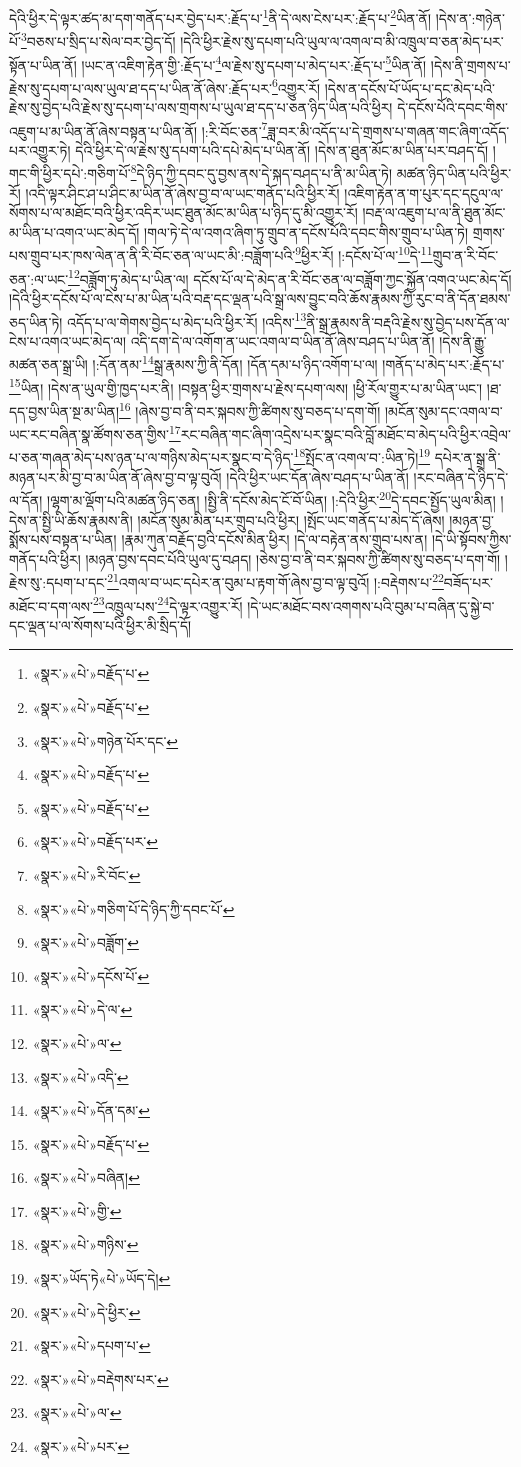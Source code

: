 དེའི་ཕྱིར་དེ་ལྟར་ཚད་མ་དག་གནོད་པར་བྱེད་པར་:རྗོད་པ་\footnote{«སྣར་»«པེ་»བརྗོད་པ་}ནི་དེ་ལས་ངེས་པར་:རྗོད་པ་\footnote{«སྣར་»«པེ་»བརྗོད་པ་}ཡིན་ནོ། །དེས་ན་:གཉེན་པོ་\footnote{«སྣར་»«པེ་»གཉེན་པོར་དང་}བཅས་པ་སྲིད་པ་སེལ་བར་བྱེད་དོ། །དེའི་ཕྱིར་རྗེས་སུ་དཔག་པའི་ཡུལ་ལ་འགལ་བ་མི་འཁྲུལ་བ་ཅན་མེད་པར་སྟོན་པ་ཡིན་ནོ། །ཡང་ན་འཇིག་རྟེན་གྱི་:རྗོད་པ་\footnote{«སྣར་»«པེ་»བརྗོད་པ་}ལ་རྗེས་སུ་དཔག་པ་མེད་པར་:རྗོད་པ་\footnote{«སྣར་»«པེ་»བརྗོད་པ་}ཡིན་ནོ། །དེས་ནི་གྲགས་པ་རྗེས་སུ་དཔག་པ་ལས་ཡུལ་ཐ་དད་པ་ཡིན་ནོ་ཞེས་:རྗོད་པར་\footnote{«སྣར་»«པེ་»བརྗོད་པར་}འགྱུར་རོ། །དེས་ན་དངོས་པོ་ཡོད་པ་དང་མེད་པའི་རྗེས་སུ་བྱེད་པའི་རྗེས་སུ་དཔག་པ་ལས་གྲགས་པ་ཡུལ་ཐ་དད་པ་ཅན་ཉིད་ཡིན་པའི་ཕྱིར། དེ་དངོས་པོའི་དབང་གིས་འཇུག་པ་མ་ཡིན་ནོ་ཞེས་བསྟན་པ་ཡིན་ནོ། །:རི་བོང་ཅན་\footnote{«སྣར་»«པེ་»རི་བོང་}ཟླ་བར་མི་འདོད་པ་དེ་གྲགས་པ་གཞན་གང་ཞིག་འདོད་པར་འགྱུར་ཏེ། དེའི་ཕྱིར་དེ་ལ་རྗེས་སུ་དཔག་པའི་དཔེ་མེད་པ་ཡིན་ནོ། །དེས་ན་ཐུན་མོང་མ་ཡིན་པར་བཤད་དོ། །གང་གི་ཕྱིར་དཔེ་:གཅིག་པོ་\footnote{«སྣར་»«པེ་»གཅིག་པོ་དེ་ཉིད་ཀྱི་དབང་པོ་}དེ་ཉིད་ཀྱི་དབང་དུ་བྱས་ནས་དེ་སྐད་བཤད་པ་ནི་མ་ཡིན་ཏེ། མཚན་ཉིད་ཡིན་པའི་ཕྱིར་རོ། །འདི་ལྟར་ཤིང་ཤ་པ་ཤིང་མ་ཡིན་ནོ་ཞེས་བྱ་བ་ལ་ཡང་གནོད་པའི་ཕྱིར་རོ། །འཇིག་རྟེན་ན་ག་པུར་དང་དངུལ་ལ་སོགས་པ་ལ་མཐོང་བའི་ཕྱིར་འདིར་ཡང་ཐུན་མོང་མ་ཡིན་པ་ཉིད་དུ་མི་འགྱུར་རོ། །བརྡ་ལ་འཇུག་པ་ལ་ནི་ཐུན་མོང་མ་ཡིན་པ་འགའ་ཡང་མེད་དོ། །གལ་ཏེ་དེ་ལ་འགའ་ཞིག་ཏུ་གྲུབ་ན་དངོས་པོའི་དབང་གིས་གྲུབ་པ་ཡིན་ཏེ། གྲགས་པས་གྲུབ་པར་ཁས་ལེན་ན་ནི་རི་བོང་ཅན་ལ་ཡང་མི་:བཟློག་པའི་\footnote{«སྣར་»«པེ་»བཟློག་}ཕྱིར་རོ། །:དངོས་པོ་ལ་\footnote{«སྣར་»«པེ་»དངོས་པོ་}དེ་\footnote{«སྣར་»«པེ་»དེ་ལ་}གྲུབ་ན་རི་བོང་ཅན་:ལ་ཡང་\footnote{«སྣར་»«པེ་»ལ་}བཟློག་ཏུ་མེད་པ་ཡིན་ལ། དངོས་པོ་ལ་དེ་མེད་ན་རི་བོང་ཅན་ལ་བཟློག་ཀྱང་སྐྱོན་འགའ་ཡང་མེད་དོ། །དེའི་ཕྱིར་དངོས་པོ་ལ་ངེས་པ་མ་ཡིན་པའི་བརྡ་དང་ལྡན་པའི་སྒྲ་ལས་བྱུང་བའི་ཆོས་རྣམས་ཀྱི་རུང་བ་ནི་དོན་ཐམས་ཅད་ཡིན་ཏེ། འདོད་པ་ལ་གེགས་བྱེད་པ་མེད་པའི་ཕྱིར་རོ། །འདིས་\footnote{«སྣར་»«པེ་»འདི་}ནི་སྒྲ་རྣམས་ནི་བརྡའི་རྗེས་སུ་བྱེད་པས་དོན་ལ་ངེས་པ་འགའ་ཡང་མེད་ལ། འདི་དག་དེ་ལ་འགོག་ན་ཡང་འགལ་བ་ཡིན་ནོ་ཞེས་བཤད་པ་ཡིན་ནོ། །དེས་ནི་རྒྱུ་མཚན་ཅན་སྒྲ་ཡི། །:དོན་ནམ་\footnote{«སྣར་»«པེ་»དོན་དམ་}སྒྲ་རྣམས་ཀྱི་ནི་དོན། །དོན་དམ་པ་ཉིད་འགོག་པ་ལ། །གནོད་པ་མེད་པར་:རྗོད་པ་\footnote{«སྣར་»«པེ་»བརྗོད་པ་}ཡིན། །དེས་ན་ཡུལ་གྱི་ཁྱད་པར་ནི། །བསྟན་ཕྱིར་གྲགས་པ་རྗེས་དཔག་ལས། །ཕྱི་རོལ་གྱུར་པ་མ་ཡིན་ཡང་། །ཐ་དད་བྱས་ཡིན་སྔ་མ་ཡིན།\footnote{«སྣར་»«པེ་»བཞིན།} །ཞེས་བྱ་བ་ནི་བར་སྐབས་ཀྱི་ཚིགས་སུ་བཅད་པ་དག་གོ། །མངོན་སུམ་དང་འགལ་བ་ཡང་རང་བཞིན་སྣ་ཚོགས་ཅན་གྱིས་\footnote{«སྣར་»«པེ་»གྱི་}རང་བཞིན་གང་ཞིག་འདྲེས་པར་སྣང་བའི་བློ་མཐོང་བ་མེད་པའི་ཕྱིར་འབྲེལ་པ་ཅན་གཞན་མེད་པས་ཉན་པ་ལ་གཉིས་མེད་པར་སྣང་བ་དེ་ཉིད་\footnote{«སྣར་»«པེ་»གཉིས་}སྤོང་ན་འགལ་བ་:ཡིན་ཏེ།\footnote{«སྣར་»ཡོད་ཏེ«པེ་»ཡོད་དེ།} དཔེར་ན་སྒྲ་ནི་མཉན་པར་མི་བྱ་བ་མ་ཡིན་ནོ་ཞེས་བྱ་བ་ལྟ་བུའོ། །དེའི་ཕྱིར་ཡང་དོན་ཞེས་བཤད་པ་ཡིན་ནོ། །རང་བཞིན་དེ་ཉིད་དེ་ལ་དོན། །ལྷག་མ་ལྡོག་པའི་མཚན་ཉིད་ཅན། །སྤྱི་ནི་དངོས་མེད་ངོ་བོ་ཡིན། །:དེའི་ཕྱིར་\footnote{«སྣར་»«པེ་»དེ་ཕྱིར་}དེ་དབང་སྤྱོད་ཡུལ་མིན། །དེས་ན་སྤྱི་ཡི་ཆོས་རྣམས་ནི། །མངོན་སུམ་མིན་པར་གྲུབ་པའི་ཕྱིར། །སྤོང་ཡང་གནོད་པ་མེད་དོ་ཞེས། །མཉན་བྱ་སྨོས་པས་བསྟན་པ་ཡིན། །རྣམ་ཀུན་བརྗོད་བྱའི་དངོས་མིན་ཕྱིར། །དེ་ལ་བརྟེན་ནས་གྲུབ་པས་ན། །དེ་ཡི་སྟོབས་ཀྱིས་གནོད་པའི་ཕྱིར། །མཉན་བྱས་དབང་པོའི་ཡུལ་དུ་བཤད། །ཅེས་བྱ་བ་ནི་བར་སྐབས་ཀྱི་ཚིགས་སུ་བཅད་པ་དག་གོ། །རྗེས་སུ་:དཔག་པ་དང་\footnote{«སྣར་»«པེ་»དཔག་པ་}འགལ་བ་ཡང་དཔེར་ན་བུམ་པ་རྟག་གོ་ཞེས་བྱ་བ་ལྟ་བུའོ། །:བརྡེགས་པ་\footnote{«སྣར་»«པེ་»བརྡེགས་པར་}བཟོད་པར་མཐོང་བ་དག་ལས་\footnote{«སྣར་»«པེ་»ལ་}འཁྲུལ་པས་\footnote{«སྣར་»«པེ་»པར་}དེ་ལྟར་འགྱུར་རོ། །དེ་ཡང་མཐོང་བས་འགགས་པའི་བུམ་པ་བཞིན་དུ་སྐྱེ་བ་དང་ལྡན་པ་ལ་སོགས་པའི་ཕྱིར་མི་སྲིད་དོ། 